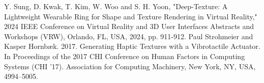 \documentclass[a4paper,twocolumn]{article}
\begin{document}
\begin{thebibliography}{99}
  \footnotesize
     Y. Sung, D. Kwak, T. Kim, W. Woo and S. H. Yoon, "Deep-Texture: A Lightweight Wearable Ring for Shape and Texture Rendering in Virtual Reality," 2024 IEEE Conference on Virtual Reality and 3D User Interfaces Abstracts and Workshops (VRW), Orlando, FL, USA, 2024, pp. 911-912.
     Paul Strohmeier and Kasper Hornbæk. 2017. Generating Haptic Textures with a Vibrotactile Actuator. In Proceedings of the 2017 CHI Conference on Human Factors in Computing Systems (CHI '17). Association for Computing Machinery, New York, NY, USA, 4994–5005.
\end{thebibliography}
\end{document}
